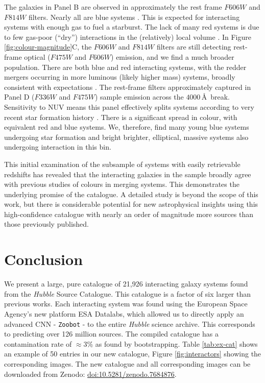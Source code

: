 {The galaxies in Panel B are observed in approximately the rest frame $F606W$ and $F814W$ filters. Nearly all are blue systems \citep[by general definitions at various redshifts, \emph{e.g.},][]{2003MNRAS.341...33K, 2012ApJ...745..179W, 2014MNRAS.440..889S}. This is expected for interacting systems with enough gas to fuel a starburst. The lack of many red systems is due to few gas-poor (``dry'') interactions in the (relatively) local volume \citep{2009A&A...501..505L}. In Figure \ref{fig:colour-magnitude}C, the $F606W$ and $F814W$ filters are still detecting rest-frame optical ($F475W$ and $F606W$) emission, and we find a much broader population. There are both blue and red interacting systems, with the redder mergers occurring in more luminous (likely higher mass) systems, broadly consistent with expectations \citep{2005AJ....130.2647V, 2008ApJ...672..177L}. The rest-frame filters approximately captured in Panel D ($F336W$ and $F475W$) sample emission across the $4000$\,\AA\ break. Sensitivity to NUV means this panel effectively splits systems according to very recent star formation history \citep{2014MNRAS.440..889S, 2015MNRAS.450..435S}. There is a significant spread in colour, with equivalent red and blue systems. We, therefore, find many young blue systems undergoing star formation and bright brighter, elliptical, massive systems also undergoing interaction in this bin.

This initial examination of the subsample of systems with easily retrievable redshifts has revealed that the interacting galaxies in the sample broadly agree with previous studies of colours in merging systems. This demonstrates the underlying promise of the catalogue. A detailed study is beyond the scope of this work, but there is considerable potential for new astrophysical insights using this high-confidence catalogue with nearly an order of magnitude more sources than those previously published.

\vspace{-3mm}

\section{Conclusion}\label{conclusion}
\noindent We present a large, pure catalogue of 21,926 interacting galaxy systems found from the \emph{Hubble} Source Catalogue. This catalogue is a factor of six larger than previous works. Each interacting system was found using the European Space Agency's new platform ESA Datalabs, which allowed us to directly apply an advanced CNN - \texttt{Zoobot} - to the entire \emph{Hubble} science archive. This corresponds to predicting over 126 million sources. The compiled catalogue has a contamination rate of $\approx$3\% as found by bootstrapping. Table \ref{tab:ex-cat} shows an example of 50 entries in our new catalogue, Figure \ref{fig:interactors} showing the corresponding images. The new catalogue and all corresponding images can be downloaded from Zenodo: \href{https://doi.org/10.5281/zenodo.7684876}{doi:10.5281/zenodo.7684876}.

}
